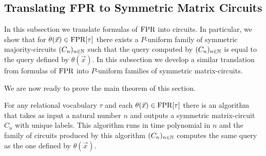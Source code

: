 \documentclass[../paper.tex]{subfiles}
\begin{document}


\subsection{Translating FPR to Symmetric Matrix Circuits}
In this subsection we translate formulas of $\text{\upshape FPR}$ into circuits. In particular,
we show that for $\theta(\vec{x}) \in \text{\upshape FPR}[\tau]$ there exists a $P$-uniform
family of symmetric majority-circuits $(C_n)_{n \in \mathbb{N}}$ such that the query
computed by $(C_n)_{n \in \mathbb{N}}$ is equal to the query defined by $\theta
(\vec{x})$. In this subsection we develop a similar translation from formulas of
$\text{\upshape FPR}$ into $P$-uniform families of symmetric matrix-circuits.


We are now ready to prove the main theorem of this section.

\begin{thm}
  For any relational vocabulary $\tau$ and each $\theta(\vec{x}) \in \text{\upshape FPR}[\tau]$
  there is an algorithm that takes as input a natural number $n$ and outputs a
  symmetric matrix-circuit $C_n$ with unique labels. This algorithm runs in time
  polynomial in $n$ and the family of circuits produced by this algorithm
  $(C_n)_{n \in \mathbb{N}}$ computes the same query as the one defined by
  $\theta(\vec{x})$.
\end{thm}
\end{document}
